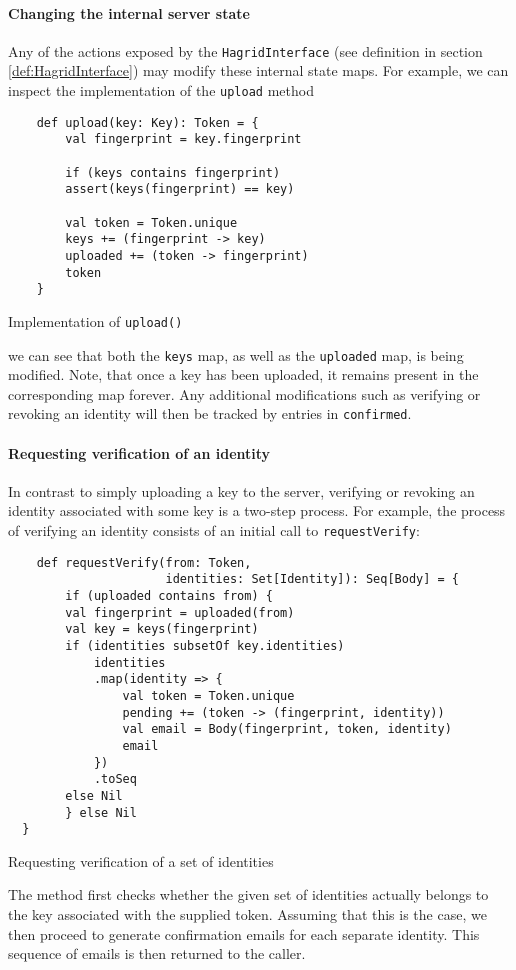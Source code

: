 \paragraph{Changing the internal server state}
Any of the actions exposed by the \texttt{HagridInterface} (see definition in section \ref{def:HagridInterface}) may modify these internal state maps.
For example, we can inspect the implementation of the \texttt{upload} method
\begin{code}
    \begin{verbatim}
    def upload(key: Key): Token = {
        val fingerprint = key.fingerprint

        if (keys contains fingerprint)
        assert(keys(fingerprint) == key)

        val token = Token.unique
        keys += (fingerprint -> key)
        uploaded += (token -> fingerprint)
        token
    }
    \end{verbatim}
    \caption{Implementation of \texttt{upload()}}
\end{code}

we can see that both the \texttt{keys} map, as well as the \texttt{uploaded} map, is being modified. Note, that once a key has been uploaded, it remains present in the corresponding map forever. Any additional modifications such as verifying or revoking an identity will then be tracked by entries in \texttt{confirmed}.

\paragraph{Requesting verification of an identity} In contrast to simply uploading a key to the server, verifying or revoking an identity associated with some key is a two-step process.
For example, the process of verifying an identity consists of an initial call to \texttt{requestVerify}:
\begin{code}
    \begin{verbatim}
    def requestVerify(from: Token, 
                      identities: Set[Identity]): Seq[Body] = {
        if (uploaded contains from) {
        val fingerprint = uploaded(from)
        val key = keys(fingerprint)
        if (identities subsetOf key.identities)
            identities
            .map(identity => {
                val token = Token.unique
                pending += (token -> (fingerprint, identity))
                val email = Body(fingerprint, token, identity)
                email
            })
            .toSeq
        else Nil
        } else Nil
  }
    \end{verbatim}
    \caption{Requesting verification of a set of identities}
\end{code}
The method first checks whether the given set of identities actually belongs to the key associated with the supplied token. Assuming that this is the case, we then proceed to generate confirmation emails for each separate identity. This sequence of emails is then returned to the caller.

